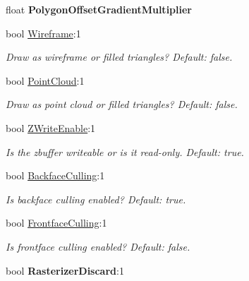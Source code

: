\begin{DoxyCompactItemize}
\item 
float {\bfseries Polygon\+Offset\+Gradient\+Multiplier}\hypertarget{classirr_1_1video_1_1SMaterial_aec45c004c02f5dbc44c6eb1009aa7f05}{}\label{classirr_1_1video_1_1SMaterial_aec45c004c02f5dbc44c6eb1009aa7f05}

\item 
bool \hyperlink{classirr_1_1video_1_1SMaterial_a6fb428e6e27d0e143cc7da5ea19f8dcc}{Wireframe}\+:1
\begin{DoxyCompactList}\small\item\em Draw as wireframe or filled triangles? Default\+: false. \end{DoxyCompactList}\item 
bool \hyperlink{classirr_1_1video_1_1SMaterial_a457d243ff8c1cd1777c70349fa55515c}{Point\+Cloud}\+:1\hypertarget{classirr_1_1video_1_1SMaterial_a457d243ff8c1cd1777c70349fa55515c}{}\label{classirr_1_1video_1_1SMaterial_a457d243ff8c1cd1777c70349fa55515c}

\begin{DoxyCompactList}\small\item\em Draw as point cloud or filled triangles? Default\+: false. \end{DoxyCompactList}\item 
bool \hyperlink{classirr_1_1video_1_1SMaterial_a0e6b40e87162a74f2c730af597e20721}{Z\+Write\+Enable}\+:1
\begin{DoxyCompactList}\small\item\em Is the zbuffer writeable or is it read-\/only. Default\+: true. \end{DoxyCompactList}\item 
bool \hyperlink{classirr_1_1video_1_1SMaterial_af3fcfcd5c2042a699a3f6b45deac475e}{Backface\+Culling}\+:1\hypertarget{classirr_1_1video_1_1SMaterial_af3fcfcd5c2042a699a3f6b45deac475e}{}\label{classirr_1_1video_1_1SMaterial_af3fcfcd5c2042a699a3f6b45deac475e}

\begin{DoxyCompactList}\small\item\em Is backface culling enabled? Default\+: true. \end{DoxyCompactList}\item 
bool \hyperlink{classirr_1_1video_1_1SMaterial_a9e0d15829ae99858ed8442582961149f}{Frontface\+Culling}\+:1\hypertarget{classirr_1_1video_1_1SMaterial_a9e0d15829ae99858ed8442582961149f}{}\label{classirr_1_1video_1_1SMaterial_a9e0d15829ae99858ed8442582961149f}

\begin{DoxyCompactList}\small\item\em Is frontface culling enabled? Default\+: false. \end{DoxyCompactList}\item 
bool {\bfseries Rasterizer\+Discard}\+:1\hypertarget{classirr_1_1video_1_1SMaterial_a47e48a49f6b6c9838432499712b35b22}{}\label{classirr_1_1video_1_1SMaterial_a47e48a49f6b6c9838432499712b35b22}

\end{DoxyCompactItemize}


